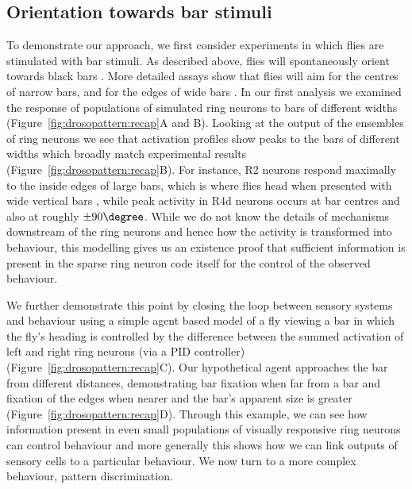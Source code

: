 
\subsection{Orientation towards bar stimuli}
\label{sec:drosopattern:results:bar}
To demonstrate our approach, we first consider experiments in which flies are stimulated with bar stimuli.
As described above, flies will spontaneously orient towards black bars \cite{Gotz1987}.
More detailed assays show that flies will aim for the centres of narrow bars, and for the edges of wide bars \cite{Osorio1990}.
In our first analysis we examined the response of populations of simulated ring neurons to bars of different widths (Figure~\ref{fig:drosopattern:recap}A and B).
Looking at the output of the ensembles of ring neurons we see that activation profiles show peaks to the bars of different widths which broadly match experimental results (Figure~\ref{fig:drosopattern:recap}B).
For instance, R2 neurons respond maximally to the inside edges of large bars, which is where flies head when presented with wide vertical bars \cite{Osorio1990}, while peak activity in R4d neurons occurs at bar centres and also at roughly $\pm 90\degree$.
While we do not know the details of mechanisms downstream of the ring neurons and hence how the activity is transformed into behaviour, this modelling gives us an existence proof that sufficient information is present in the sparse ring neuron code itself for the control of the observed behaviour. 

We further demonstrate this point by closing the loop between sensory systems and behaviour using a simple agent based model of a fly viewing a bar in which the fly's heading is controlled by the difference between the summed activation of left and right ring neurons (via a PID controller) (Figure~\ref{fig:drosopattern:recap}C). Our hypothetical agent approaches the bar from different distances, demonstrating bar fixation when far from a bar and fixation of the edges when nearer and the bar's apparent size is greater (Figure~\ref{fig:drosopattern:recap}D). Through this example, we can see how information present in even small populations of visually responsive ring neurons can control behaviour and more generally this shows how we can link outputs of sensory cells to a particular behaviour. We now turn to a more complex behaviour, pattern discrimination.

